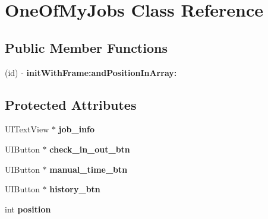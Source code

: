 \hypertarget{interface_one_of_my_jobs}{
\section{\-One\-Of\-My\-Jobs \-Class \-Reference}
\label{interface_one_of_my_jobs}
}
\subsection*{\-Public \-Member \-Functions}
\begin{DoxyCompactItemize}
\item 
\hypertarget{interface_one_of_my_jobs_a7ebc9dad85d390a1237f7eede7c22c5c}{
(id) -\/ {\bfseries init\-With\-Frame\-:and\-Position\-In\-Array\-:}}
\label{interface_one_of_my_jobs_a7ebc9dad85d390a1237f7eede7c22c5c}

\end{DoxyCompactItemize}
\subsection*{\-Protected \-Attributes}
\begin{DoxyCompactItemize}
\item 
\hypertarget{interface_one_of_my_jobs_ab60c3bed846b02de81e161d7bc7bb0da}{
\-U\-I\-Text\-View $\ast$ {\bfseries job\-\_\-info}}
\label{interface_one_of_my_jobs_ab60c3bed846b02de81e161d7bc7bb0da}

\item 
\hypertarget{interface_one_of_my_jobs_a0d74004b350471ece6f1d9037690ad97}{
\-U\-I\-Button $\ast$ {\bfseries check\-\_\-in\-\_\-out\-\_\-btn}}
\label{interface_one_of_my_jobs_a0d74004b350471ece6f1d9037690ad97}

\item 
\hypertarget{interface_one_of_my_jobs_ab1040d48035fac8cc04c2ebe2e7b2334}{
\-U\-I\-Button $\ast$ {\bfseries manual\-\_\-time\-\_\-btn}}
\label{interface_one_of_my_jobs_ab1040d48035fac8cc04c2ebe2e7b2334}

\item 
\hypertarget{interface_one_of_my_jobs_af3441b0bf333d58105fb40957d58e7c6}{
\-U\-I\-Button $\ast$ {\bfseries history\-\_\-btn}}
\label{interface_one_of_my_jobs_af3441b0bf333d58105fb40957d58e7c6}

\item 
\hypertarget{interface_one_of_my_jobs_a2f6393e6505577ec99bed2753593761e}{
int {\bfseries position}}
\label{interface_one_of_my_jobs_a2f6393e6505577ec99bed2753593761e}

\end{DoxyCompactItemize}
